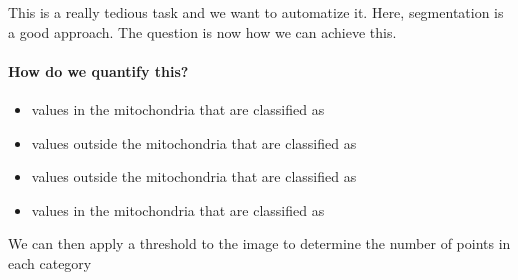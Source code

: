 \documentclass[letterpaper,10pt,english]{sphinxmanual}
\begin{document}
\sphinxAtStartPar
This is a really tedious task and we want to automatize it. Here, segmentation is a good approach. The question is now how we can achieve this.


\paragraph{How do we quantify this?}
\label{\detokenize{04-BasicSegmentation_Part2:how-do-we-quantify-this}}

\begin{itemize}
\item {} 
\sphinxAtStartPar
{} values in the mitochondria that are classified as 

\item {} 
\sphinxAtStartPar
{} values outside the mitochondria that are classified as 

\end{itemize}




\begin{itemize}
\item {} 
\sphinxAtStartPar
{} values outside the mitochondria that are classified as 

\item {} 
\sphinxAtStartPar
{} values in the mitochondria that are classified as 

\end{itemize}



\sphinxAtStartPar
We can then apply a threshold to the image to determine the number of points in each category
\end{document}
